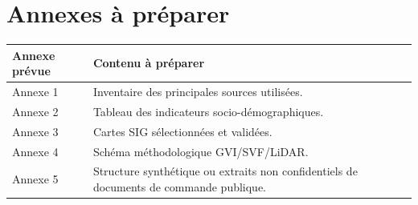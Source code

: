 \documentclass[11pt,a4paper]{report}
\begin{document}
\chapter*{Annexes à préparer}

\begin{longtable}{p{} p{}}
\textbf{Annexe prévue} & \textbf{Contenu à préparer}\\
\hline
Annexe 1 & Inventaire des principales sources utilisées.\\
Annexe 2 & Tableau des indicateurs socio-démographiques.\\
Annexe 3 & Cartes SIG sélectionnées et validées.\\
Annexe 4 & Schéma méthodologique GVI/SVF/LiDAR.\\
Annexe 5 & Structure synthétique ou extraits non confidentiels de documents de commande publique.\\
\end{longtable}
\end{document}
